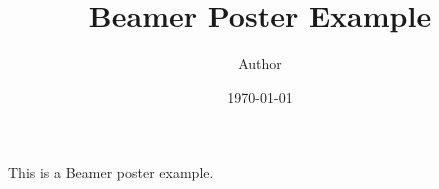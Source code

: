\documentclass{beamer}
\title[Beamer Poster]{Beamer Poster Example}
\author[welcome@overleaf.com]{Author}
\institute[Overleaf University]{LaTeX Cookbook Institute}
\date{\today}
\begin{document}
This is a Beamer poster example.
\end{document}
